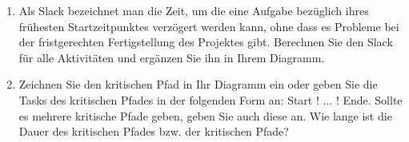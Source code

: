 \documentclass{lehramt-informatik-aufgabe}
\begin{document}
\begin{enumerate}
\begin{liAntwort}
\begin{center}
\end{center}
\end{liAntwort}


\item Als Slack bezeichnet man die Zeit, um die eine Aufgabe bezüglich
ihres frühesten Startzeitpunktes verzögert werden kann, ohne dass es
Probleme bei der fristgerechten Fertigstellung des Projektes gibt.
Berechnen Sie den Slack für alle Aktivitäten und ergänzen Sie ihn in
Ihrem Diagramm.


\item Zeichnen Sie den kritischen Pfad in Ihr Diagramm ein oder geben
Sie die Tasks des kritischen Pfades in der folgenden Form an: Start !
$\dots$ ! Ende. Sollte es mehrere kritische Pfade geben, geben Sie auch
diese an. Wie lange ist die Dauer des kritischen Pfades bzw. der
kritischen Pfade?

\end{enumerate}
\end{document}
